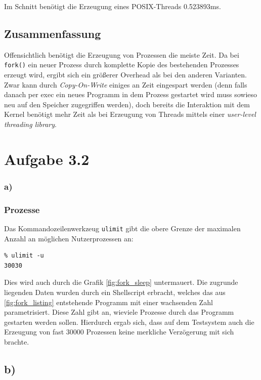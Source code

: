 \documentclass[a4paper,
12pt,
BCOR12mm,
]{scrartcl}
\begin{document}

Im Schnitt benötigt die Erzeugung eines POSIX-Threads 0.523893ms.

\subsection{Zusammenfassung}
Offensichtlich benötigt die Erzeugung von Prozessen die meiste Zeit. Da bei
\verb|fork()| ein neuer Prozess durch komplette Kopie des bestehenden Prozesses
erzeugt wird, ergibt sich ein größerer Overhead als bei den anderen Varianten. Zwar
kann durch \emph{Copy-On-Write} einiges an Zeit eingespart werden (denn falls danach per
exec ein neues Programm in dem Prozess gestartet wird muss sowieso neu auf den Speicher
zugegriffen werden), doch bereits die Interaktion mit dem Kernel benötigt mehr Zeit als
bei Erzeugung von Threads mittels einer \emph{user-level threading library}.
\section{Aufgabe 3.2}
\subsubsection{a)}
\subsubsection{Prozesse}
Das Kommandozeilenwerkzeug \verb|ulimit| gibt die obere Grenze der maximalen Anzahl an
möglichen Nutzerprozessen an:
\begin{verbatim}
% ulimit -u
30030
\end{verbatim}
Dies wird auch durch die Grafik \ref{fig:fork_sleep} untermauert. Die zugrunde liegenden
Daten wurden durch ein Shellscript erbracht, welches das aus \ref{fig:fork_listing}
entstehende Programm mit einer wachsenden Zahl parametrisiert. Diese Zahl gibt an,
wieviele Prozesse durch das Programm gestarten werden sollen. Hierdurch ergab sich, dass
auf dem Testsystem auch die Erzeugung von fast $30000$ Prozessen keine merkliche
Verzögerung mit sich brachte.
\subsection{b)}
\end{document}
